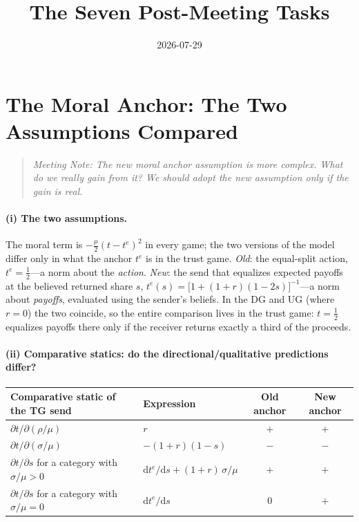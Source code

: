 \documentclass[11pt]{article}
\title{The Seven Post-Meeting Tasks}
\date{2026-07-29}
\newcommand{\code}[1]{\path{#1}}
\begin{document}
\maketitle

\section{The Moral Anchor: The Two Assumptions Compared}

\begin{quote}\itshape
Meeting Note: The new moral anchor assumption is more complex. What do we really gain from it? We should adopt the new assumption only if the gain is real.
\end{quote}


\paragraph{(i) The two assumptions.} The moral term is $-\frac{\mu}{2}(t-t^{e})^{2}$
in every game; the two versions of the model differ only in what the anchor $t^{e}$ is
in the trust game. \emph{Old}: the equal-split action, $t^{e}=\tfrac12$---a norm about
the \emph{action}. \emph{New}: the send that equalizes expected payoffs at
the believed returned share $s$, $t^{e}(s)=\bigl[1+(1+r)(1-2s)\bigr]^{-1}$---a norm
about \emph{payoffs}, evaluated using the sender's
beliefs. In the DG and UG (where $r=0$) the two coincide, so the entire comparison lives in the trust game: $t=\tfrac12$ equalizes payoffs there
only if the receiver returns exactly a third of the proceeds. %

\paragraph{(ii) Comparative statics: do the directional/qualitative predictions differ?} 

\begin{center}
\small
\begin{tabular}{l l cc}
\toprule
Comparative static of the TG send & Expression & Old anchor & New anchor \\
\midrule
$\partial t/\partial(\rho/\mu)$ & $r$ & $+$ & $+$ \\
$\partial t/\partial(\sigma/\mu)$ & $-(1+r)(1-s)$ & $-$ & $-$ \\
$\partial t/\partial s$ for a category with $\sigma/\mu>0$ &
$\mathrm{d}t^{e}/\mathrm{d}s+(1+r)\,\sigma/\mu$ & $+$ & $+$ \\
$\partial t/\partial s$ for a category with $\sigma/\mu=0$ &
$\mathrm{d}t^{e}/\mathrm{d}s$ & $0$ & $+$ \\
\bottomrule
\end{tabular}
\end{center}
\end{document}
